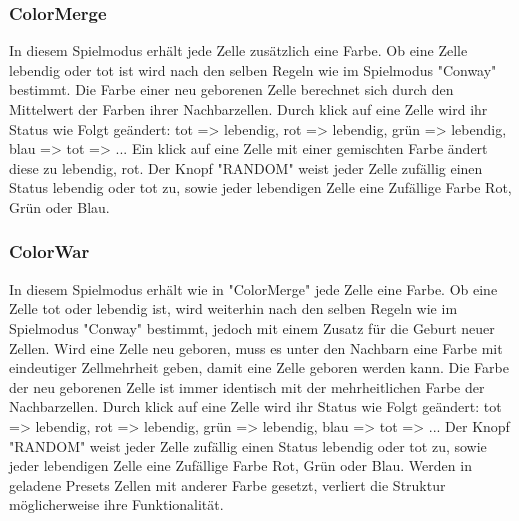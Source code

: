 \documentclass[12pt]{article}
\theoremstyle{plain}
\begin{document}
\begin{linenumbers}
\subsubsection{ColorMerge}
In diesem Spielmodus erhält jede Zelle zusätzlich eine Farbe. Ob eine Zelle lebendig oder tot ist wird nach den selben Regeln wie im Spielmodus "Conway" bestimmt. Die Farbe einer neu geborenen Zelle berechnet sich durch den Mittelwert der Farben ihrer Nachbarzellen. Durch klick auf eine Zelle wird ihr Status wie Folgt geändert:
\newline
tot => lebendig, rot => lebendig, grün => lebendig, blau => tot => ...
\newline
Ein klick auf eine Zelle mit einer gemischten Farbe ändert diese zu lebendig, rot. Der Knopf "RANDOM" weist jeder Zelle zufällig einen Status lebendig oder tot zu, sowie jeder lebendigen Zelle eine Zufällige Farbe Rot, Grün oder Blau.

\subsubsection{ColorWar}
In diesem Spielmodus erhält wie in "ColorMerge" jede Zelle eine Farbe. Ob eine Zelle tot oder lebendig ist, wird weiterhin nach den selben Regeln wie im Spielmodus "Conway" bestimmt, jedoch mit einem Zusatz für die Geburt neuer Zellen. Wird eine Zelle neu geboren, muss es unter den Nachbarn eine Farbe mit eindeutiger Zellmehrheit geben, damit eine Zelle geboren werden kann. Die Farbe der neu geborenen Zelle ist immer identisch mit der mehrheitlichen Farbe der Nachbarzellen.
\newline
Durch klick auf eine Zelle wird ihr Status wie Folgt geändert:
\newline
tot => lebendig, rot => lebendig, grün => lebendig, blau => tot => ...
\newline
Der Knopf "RANDOM" weist jeder Zelle zufällig einen Status lebendig oder tot zu, sowie jeder lebendigen Zelle eine Zufällige Farbe Rot, Grün oder Blau. Werden in geladene Presets Zellen mit anderer Farbe gesetzt, verliert die Struktur möglicherweise ihre Funktionalität.


\end{linenumbers}
\end{document}
